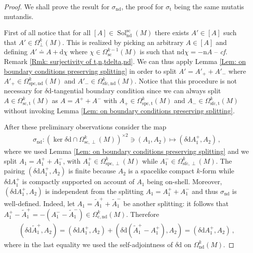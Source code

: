 \begin{proof}
	We shall prove the result for $\sigma_{\mathrm{nd}}$, the proof for $\sigma_{\mathrm{t}}$ being the same mutatis mutandis.
	
	First of all notice that for all $[A]\in\operatorname{Sol}_{\mathrm{nd}}^{\mathrm{sc}}(M)$ there exists $A'\in[A]$ such that $A'\in\Omega_\perp^k(M)$.
	This is realized by picking an arbitrary $A\in[A]$ and defining $A'\doteq A+\mathrm{d}\chi$ where $\chi\in\Omega_{\mathrm{sc}}^{k-1}(M)$ is such that $\mathrm{nd}\chi=-\mathrm{n}A$ -- \textit{cf.} Remark \ref{Rmk: surjectivity of t,n,tdelta,nd}.
	We can thus apply Lemma \ref{Lem: on boundary conditions preserving splitting} in order to split $A'=A'_++A'_-$ where $A'_+\in\Omega_{\mathrm{spc,nd}}^k(M)$ and $A'_-\in\Omega_{\mathrm{sfc,nd}}^k(M)$. Notice that this procedure is not necessary for $\delta\mathrm{d}$-tangential boundary condition since we can always split $A\in\Omega_{\mathrm{sc,t}}^k(M)$ as
	$A=A^++A^-$ with $A_+\in\Omega_{\mathrm{spc,t}}^k(M)$ and $A_-\in\Omega_{\mathrm{sfc,t}}^k(M)$ without invoking Lemma \ref{Lem: on boundary conditions preserving splitting}.
	
	After these preliminary observations consider the map
	\begin{align*}
	\sigma_{\mathrm{nd}}\colon(\ker\delta\mathrm{d}\cap\Omega_{\mathrm{sc},\perp}^k(M))^{\times 2}\ni(A_1,A_2)\mapsto(\delta\mathrm{d}A_1^+,A_2)\,,
	\end{align*}
	where we used Lemma \ref{Lem: on boundary conditions preserving splitting} and we split $A_1=A_1^++A_1^-$, with $A_1^+\in\Omega_{\mathrm{spc},\perp}^k(M)$ while $A_1^-\in\Omega_{\mathrm{sfc},\perp}^k(M)$.
	The pairing $(\delta\mathrm{d}A_1^+,A_2)$ is finite because $A_2$ is a spacelike compact $k$-form while $\delta\mathrm{d}A_1^+$ is compactly supported on account of $A_1$ being on-shell.
	Moreover, $(\delta\mathrm{d}A_1^+,A_2)$ is independent from the splitting $A_1=A_1^++A_1^-$ and thus $\sigma_{\mathrm{nd}}$ is well-defined.
	Indeed, let $A_1=\widetilde{A}_1^++\widetilde{A}_1^-$ be another splitting: it follows that $A_1^+-\widetilde{A}_1^+=-(A_1^--\widetilde{A}_1^-)\in\Omega_{\mathrm{c,nd}}^k(M)$. Therefore
	\begin{align*}
	(\delta\mathrm{d}\widetilde{A}_1^+,A_2)=
	(\delta\mathrm{d}A_1^+,A_2)+
	(\delta\mathrm{d}(\widetilde{A}_1^+-A_1^+),A_2)=
	(\delta\mathrm{d}A_1^+,A_2)\,,
	\end{align*}
	where in the last equality we used the self-adjointness of $\delta\mathrm{d}$ on $\Omega_{\mathrm{nd}}^k(M)$.
	

\end{proof}
